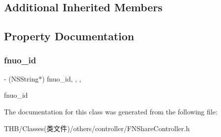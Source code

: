 \subsection*{Additional Inherited Members}


\subsection{Property Documentation}
\mbox{\label{interface_f_n_share_controller_a4f25a598502b0e8fb06d66076753b3d3}} 
\subsubsection{\texorpdfstring{fnuo\+\_\+id}{fnuo\_id}}
{\footnotesize\ttfamily -\/ (N\+S\+String$\ast$) fnuo\+\_\+id\hspace{0.3cm}{\ttfamily [read]}, {\ttfamily [write]}, {\ttfamily [nonatomic]}, {\ttfamily [copy]}}

fnuo\+\_\+id 

The documentation for this class was generated from the following file\+:\begin{DoxyCompactItemize}
\item 
T\+H\+B/\+Classes(类文件)/others/controller/F\+N\+Share\+Controller.\+h\end{DoxyCompactItemize}
